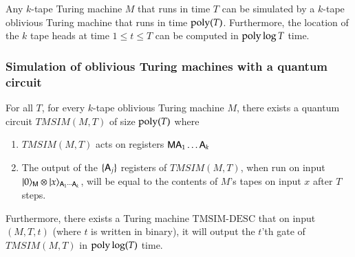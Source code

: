 \begin{theorem}\label{thm:pippenger}
Any $k$-tape Turing machine $M$ that runs in time $T$ can be simulated by a $k$-tape oblivious Turing machine that runs in time $\operatorname{poly}(T)$. Furthermore, the location of the $k$ tape heads at time $1 \leq t \leq T$ can be computed in $\operatorname{poly} \log T$ time.
\end{theorem}


\subsubsection{Simulation of oblivious Turing machines with a quantum circuit}

\begin{lemma}\label{lem:tmsim}
	For all $T$, for every $k$-tape oblivious Turing machine $M$, there exists a quantum circuit $TMSIM(M,T)$ of size $\operatorname{poly}(T)$ where
	\begin{enumerate}
		\item $TMSIM(M,T)$ acts on registers ${\mathsf{M}} {\mathsf{A}}_1 \ldots {\mathsf{A}}_k$
		\item The output of the $\{{\mathsf{A}}_j\}$ registers of $TMSIM(M,T)$, when run on input $|0\rangle_{{\mathsf{M}}} \otimes |x\rangle_{{\mathsf{A}}_1 \cdots {\mathsf{A}}_k}$, will be equal to the contents of $M$'s tapes on input $x$ after $T$ steps.
	\end{enumerate}
	Furthermore, there exists a Turing machine $\text{TMSIM-DESC}$ that on input $(M,T,t)$ (where $t$ is written in binary), it will output the $t$'th gate of $TMSIM(M,T)$ in $\operatorname{poly}\log(T)$ time. 
\end{lemma}

